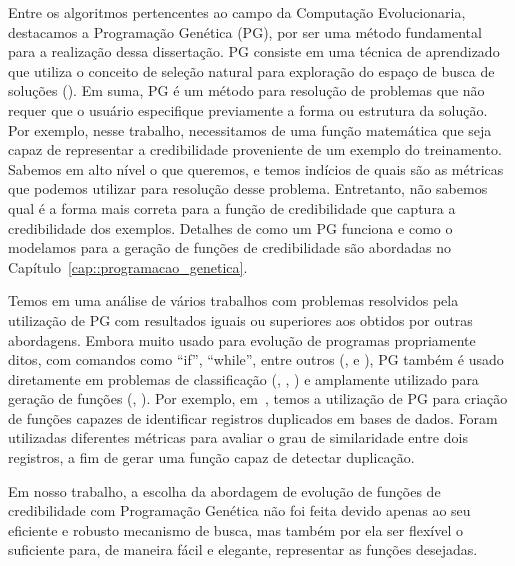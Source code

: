 Entre os algoritmos pertencentes ao campo da Computação Evolucionaria, destacamos a Programação Genética (\textsc{PG}), por ser uma método fundamental para a realização dessa dissertação. \textsc{PG} consiste em uma técnica de aprendizado que utiliza o conceito de seleção natural para exploração do espaço de busca de soluções (\cite{Koza92}).
Em suma, \textsc{PG} é um método para resolução de problemas que não requer que o usuário especifique previamente a forma ou estrutura da solução.
Por exemplo, nesse trabalho, necessitamos de uma função matemática que seja capaz de representar a credibilidade proveniente de um exemplo do treinamento.
Sabemos em alto nível o que queremos, e temos indícios de quais são as métricas que podemos utilizar para resolução desse problema. Entretanto, não sabemos qual é a forma mais correta para a função de credibilidade que captura a credibilidade dos exemplos. Detalhes de como um \textsc{PG} funciona e como o modelamos para a geração de funções de credibilidade são abordadas no Capítulo~\ref{cap::programacao_genetica}.

Temos em \cite{Koza10} uma análise de vários trabalhos com problemas resolvidos pela utilização de \textsc{PG} com resultados iguais ou superiores aos obtidos por outras abordagens.
Embora muito usado para evolução de programas propriamente ditos, com comandos como ``if'', ``while'', entre outros (\cite{Spector98}, \cite{Hauptman07} e \cite{Forrest09}),
\textsc{PG} também é usado diretamente em problemas de classificação (\cite{cavaretta99}, \cite{kishore00}, \cite{freitas02}) e amplamente utilizado para geração de funções (\cite{Golubski02}, \cite{Freitas10}). 
Por exemplo, em~\cite{Freitas10}, temos a utilização de \textsc{PG} para criação de funções capazes de identificar registros duplicados em bases de dados. Foram utilizadas diferentes métricas para avaliar o grau de similaridade entre dois registros, a fim de gerar uma função capaz de detectar duplicação.

Em nosso trabalho, a escolha da abordagem de evolução de funções de credibilidade com Programação Genética não foi feita devido apenas ao seu eficiente e robusto mecanismo de busca, mas também por ela ser flexível o suficiente para, de maneira fácil e elegante, representar as funções desejadas.



